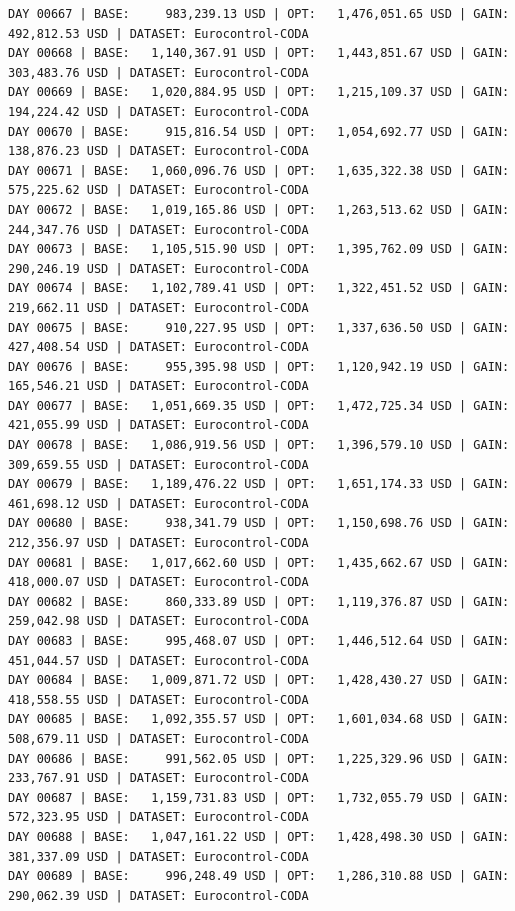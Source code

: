 \documentclass[11pt,a4paper]{article}
\begin{document}
\begin{verbatim}
DAY 00667 | BASE:     983,239.13 USD | OPT:   1,476,051.65 USD | GAIN: 492,812.53 USD | DATASET: Eurocontrol-CODA
DAY 00668 | BASE:   1,140,367.91 USD | OPT:   1,443,851.67 USD | GAIN: 303,483.76 USD | DATASET: Eurocontrol-CODA
DAY 00669 | BASE:   1,020,884.95 USD | OPT:   1,215,109.37 USD | GAIN: 194,224.42 USD | DATASET: Eurocontrol-CODA
DAY 00670 | BASE:     915,816.54 USD | OPT:   1,054,692.77 USD | GAIN: 138,876.23 USD | DATASET: Eurocontrol-CODA
DAY 00671 | BASE:   1,060,096.76 USD | OPT:   1,635,322.38 USD | GAIN: 575,225.62 USD | DATASET: Eurocontrol-CODA
DAY 00672 | BASE:   1,019,165.86 USD | OPT:   1,263,513.62 USD | GAIN: 244,347.76 USD | DATASET: Eurocontrol-CODA
DAY 00673 | BASE:   1,105,515.90 USD | OPT:   1,395,762.09 USD | GAIN: 290,246.19 USD | DATASET: Eurocontrol-CODA
DAY 00674 | BASE:   1,102,789.41 USD | OPT:   1,322,451.52 USD | GAIN: 219,662.11 USD | DATASET: Eurocontrol-CODA
DAY 00675 | BASE:     910,227.95 USD | OPT:   1,337,636.50 USD | GAIN: 427,408.54 USD | DATASET: Eurocontrol-CODA
DAY 00676 | BASE:     955,395.98 USD | OPT:   1,120,942.19 USD | GAIN: 165,546.21 USD | DATASET: Eurocontrol-CODA
DAY 00677 | BASE:   1,051,669.35 USD | OPT:   1,472,725.34 USD | GAIN: 421,055.99 USD | DATASET: Eurocontrol-CODA
DAY 00678 | BASE:   1,086,919.56 USD | OPT:   1,396,579.10 USD | GAIN: 309,659.55 USD | DATASET: Eurocontrol-CODA
DAY 00679 | BASE:   1,189,476.22 USD | OPT:   1,651,174.33 USD | GAIN: 461,698.12 USD | DATASET: Eurocontrol-CODA
DAY 00680 | BASE:     938,341.79 USD | OPT:   1,150,698.76 USD | GAIN: 212,356.97 USD | DATASET: Eurocontrol-CODA
DAY 00681 | BASE:   1,017,662.60 USD | OPT:   1,435,662.67 USD | GAIN: 418,000.07 USD | DATASET: Eurocontrol-CODA
DAY 00682 | BASE:     860,333.89 USD | OPT:   1,119,376.87 USD | GAIN: 259,042.98 USD | DATASET: Eurocontrol-CODA
DAY 00683 | BASE:     995,468.07 USD | OPT:   1,446,512.64 USD | GAIN: 451,044.57 USD | DATASET: Eurocontrol-CODA
DAY 00684 | BASE:   1,009,871.72 USD | OPT:   1,428,430.27 USD | GAIN: 418,558.55 USD | DATASET: Eurocontrol-CODA
DAY 00685 | BASE:   1,092,355.57 USD | OPT:   1,601,034.68 USD | GAIN: 508,679.11 USD | DATASET: Eurocontrol-CODA
DAY 00686 | BASE:     991,562.05 USD | OPT:   1,225,329.96 USD | GAIN: 233,767.91 USD | DATASET: Eurocontrol-CODA
DAY 00687 | BASE:   1,159,731.83 USD | OPT:   1,732,055.79 USD | GAIN: 572,323.95 USD | DATASET: Eurocontrol-CODA
DAY 00688 | BASE:   1,047,161.22 USD | OPT:   1,428,498.30 USD | GAIN: 381,337.09 USD | DATASET: Eurocontrol-CODA
DAY 00689 | BASE:     996,248.49 USD | OPT:   1,286,310.88 USD | GAIN: 290,062.39 USD | DATASET: Eurocontrol-CODA

\end{verbatim}
\end{document}
